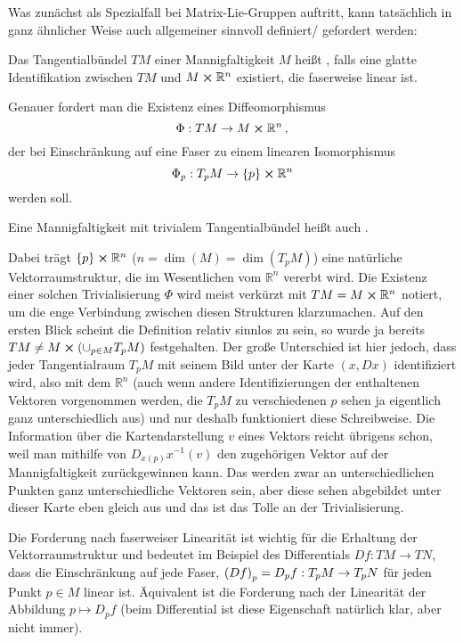 \documentclass[../H_Analysis_main.tex]{subfiles}
\begin{document}
Was zunächst als Spezialfall bei Matrix-Lie-Gruppen auftritt, kann tatsächlich in ganz ähnlicher Weise auch allgemeiner sinnvoll definiert/ gefordert werden:
\begin{defi}
Das Tangentialbündel $TM$ einer Mannigfaltigkeit $M$ heißt , falls eine glatte Identifikation zwischen $TM$ und $M \cross \mathbb{R}^n$ existiert, die faserweise linear ist.

Genauer fordert man die Existenz eines Diffeomorphismus
\begin{equation}
\Phi: TM \rightarrow M \cross \mathbb{R}^n \, ,
\end{equation}
der bei Einschränkung auf eine Faser zu einem linearen Isomorphismus
\begin{equation}
\Phi_p: T_p M \rightarrow \qty{p} \cross \mathbb{R}^n
\end{equation}
werden soll.

Eine Mannigfaltigkeit mit trivialem Tangentialbündel heißt auch .
\end{defi}
Dabei trägt $\qty{p} \cross \mathbb{R}^n$ ($n = \dim(M) = \dim(T_p M)$) eine natürliche Vektorraumstruktur, die im Wesentlichen vom $\mathbb{R}^n$ vererbt wird. Die Existenz einer solchen Trivialisierung $\Phi$ wird meist verkürzt mit $TM = M \cross \mathbb{R}^n$ notiert, um die enge Verbindung zwischen diesen Strukturen klarzumachen. Auf den ersten Blick scheint die Definition relativ sinnlos zu sein, so wurde ja bereits $TM \neq M \cross \qty(\cup_{p \in M} T_p M)$ festgehalten. Der große Unterschied ist hier jedoch, dass jeder Tangentialraum $T_p M$ mit seinem Bild unter der Karte $(x, Dx)$ identifiziert wird, also mit dem $\mathbb{R}^n$ (auch wenn andere Identifizierungen der enthaltenen Vektoren vorgenommen werden, die $T_p M$ zu verschiedenen $p$ sehen ja eigentlich ganz unterschiedlich aus) und nur deshalb funktioniert diese Schreibweise. Die Information über die Kartendarstellung $v$ eines Vektors reicht übrigens schon, weil man mithilfe von $D_{x(p)} x^{-1}(v)$ den zugehörigen Vektor auf der Mannigfaltigkeit zurückgewinnen kann. Das werden zwar an unterschiedlichen Punkten ganz unterschiedliche Vektoren sein, aber diese sehen abgebildet unter dieser Karte eben gleich aus und das ist das Tolle an der Trivialisierung.

Die Forderung nach faserweiser Linearität ist wichtig für die Erhaltung der Vektorraumstruktur und bedeutet im Beispiel des Differentials $Df: TM \rightarrow TN$, dass die Einschränkung auf jede Faser, $\qty(Df)_p = D_p f: T_p M \rightarrow T_p N$ für jeden Punkt $p \in M$ linear ist. Äquivalent ist die Forderung nach der Linearität der Abbildung $p \mapsto D_p f$ (beim Differential ist diese Eigenschaft natürlich klar, aber nicht immer).\\
\end{document}
